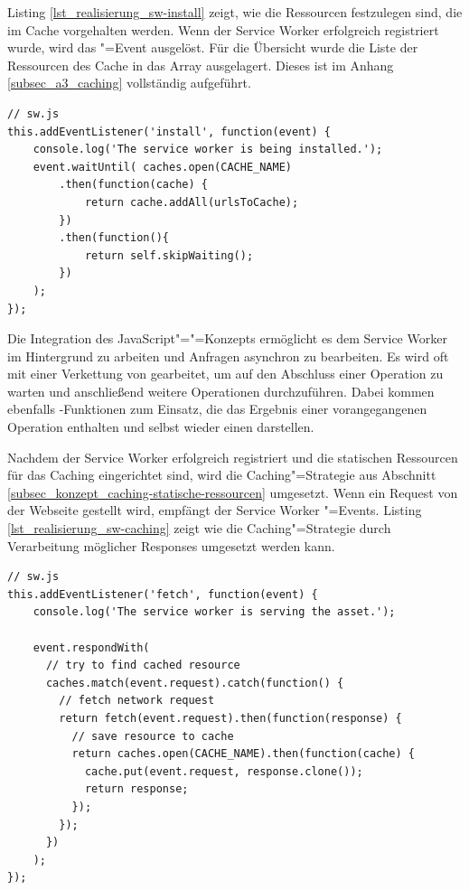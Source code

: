Listing \ref{lst_realisierung_sw-install} zeigt, wie die Ressourcen festzulegen sind, die im Cache vorgehalten werden. Wenn der Service Worker erfolgreich registriert wurde, wird das "=Event ausgelöst. Für die Übersicht wurde die Liste der Ressourcen des Cache in das Array  ausgelagert. Dieses ist im Anhang \ref{subsec_a3_caching} vollständig aufgeführt.\\

\begin{lstlisting}[caption={Ressourcen festlegen, die im Zwischenspeicher vorgehalten werden sollen},label={lst_realisierung_sw-install}, frame=single]
// sw.js
this.addEventListener('install', function(event) {
    console.log('The service worker is being installed.');
    event.waitUntil( caches.open(CACHE_NAME)
        .then(function(cache) {
            return cache.addAll(urlsToCache);
        })
        .then(function(){
            return self.skipWaiting();
        })
    );
});
\end{lstlisting}
  
Die Integration des JavaScript"="=Konzepts ermöglicht es dem Service Worker im Hintergrund zu arbeiten und Anfragen asynchron zu bearbeiten. Es wird oft mit einer Verkettung von  gearbeitet, um auf den Abschluss einer Operation zu warten und anschließend weitere Operationen durchzuführen. Dabei kommen ebenfalls -Funktionen zum Einsatz, die das Ergebnis einer vorangegangenen Operation enthalten und selbst wieder einen  darstellen.  

Nachdem der Service Worker erfolgreich registriert und die statischen Ressourcen für das Caching eingerichtet sind, wird die Caching"=Strategie aus Abschnitt \ref{subsec_konzept_caching-statische-ressourcen} umgesetzt. Wenn ein Request von der Webseite gestellt wird, empfängt der Service Worker "=Events. Listing \ref{lst_realisierung_sw-caching} zeigt wie die Caching"=Strategie durch Verarbeitung möglicher Responses umgesetzt werden kann. \\

\begin{lstlisting}[caption={Verarbeitung empfangener Requests und Auswertung möglicher Responses im Service Worker},label={lst_realisierung_sw-caching}, frame=single]
// sw.js
this.addEventListener('fetch', function(event) {
    console.log('The service worker is serving the asset.');

    event.respondWith(
      // try to find cached resource
      caches.match(event.request).catch(function() {
        // fetch network request
        return fetch(event.request).then(function(response) {
          // save resource to cache
          return caches.open(CACHE_NAME).then(function(cache) {
            cache.put(event.request, response.clone());
            return response;
          });  
        });
      })
    );
});
\end{lstlisting}


